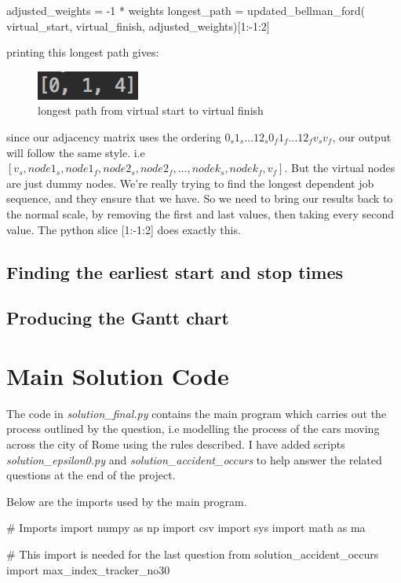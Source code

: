 \documentclass[paper=a4, fontsize=12pt]{scrartcl} %
\numberwithin{equation}{section}       %
\numberwithin{figure}{section}         %
\numberwithin{table}{section}          %
\begin{document}
\begin{python}
    adjusted_weights = -1 * weights
    longest_path = updated_bellman_ford(
        virtual_start, virtual_finish, adjusted_weights)[1:-1:2]
\end{python}
printing this longest path gives:
\begin{figure}[h]
\caption{longest path from virtual start to virtual finish}
\centering
\includegraphics[scale=0.9]{long}
\end{figure}

\bcattention \quad since our adjacency matrix uses the ordering $0_{s} 1_{s} \dots 12_{s} 0_{f} 1_{f} \dots 12_{f} v_{s} v_{f}$, our output will follow the same style. i.e $[v_{s},node1_{s},node1_{f},node2_{s},node2_{f},\dots,nodek_{s},nodek_{f},v_{f}]$. But the virtual nodes are just dummy nodes. We're really trying to find the longest dependent job sequence, and they ensure that we have. So we need to bring our results back to the normal scale, by removing the first and last values, then taking every second value. The python slice [1:-1:2] does exactly this.

\subsection{Finding the earliest start and stop times}
\subsection{Producing the Gantt chart}
\section{Main Solution Code}

The code in \textit{solution\_final.py} contains the main program which carries out the process outlined by the question, i.e modelling the process of the cars moving across the city of Rome using the rules described. I have added scripts \textit{solution\_epsilon0.py} and \textit{solution\_accident\_occurs} to help answer the related questions at the end of the project.
\newline

Below are the imports used by the main program.

\begin{python}
# Imports
import numpy as np
import csv
import sys
import math as ma

# This import is needed for the last question
from solution_accident_occurs import max_index_tracker_no30
\end{python}
\end{document}

